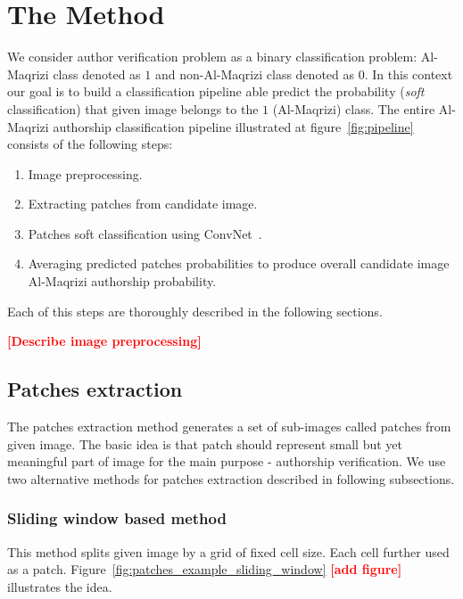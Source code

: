 \documentclass[conference,a4paper,twocolumn]{IEEEtran}
\newcommand{\convnet}{ConvNet~} %
\newcommand{\todo}[1]{\textcolor{red}{\textbf{[#1]}}} %
\begin{document}

\section{The Method}
\label{sec:the_method}

We consider author verification problem as a binary classification problem: Al-Maqrizi class denoted as $1$ and non-Al-Maqrizi class denoted as $0$. In this context our goal is to build a classification pipeline able predict the probability (\textit{soft} classification) that given image belongs to the $1$ (Al-Maqrizi) class. The entire Al-Maqrizi authorship classification pipeline illustrated at figure~\ref{fig:pipeline} consists of the following steps:

\begin{enumerate}
	\item Image preprocessing.
	\item Extracting patches from candidate image.
	\item Patches soft classification using \convnet.
	\item Averaging predicted patches probabilities to produce overall candidate image Al-Maqrizi authorship probability.
\end{enumerate}



Each of this steps are thoroughly described in the following sections.	


\todo{Describe image preprocessing}

\subsection{Patches extraction}
The patches extraction method generates a set of sub-images called patches from given image. The basic idea is that patch should represent small but yet meaningful part of image for the main purpose - authorship verification. We use two alternative methods for patches extraction described in following subsections.

\subsubsection{Sliding window based method}
This method splits given image by a grid of fixed cell size. Each cell further used as a patch. Figure~\ref{fig:patches_example_sliding_window} \todo{add figure} illustrates the idea. 
\end{document}
